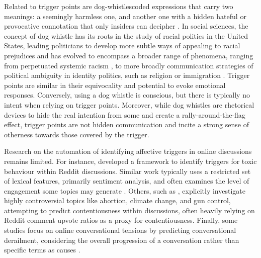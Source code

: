 Related to trigger points are dog-whistles\textemdash coded expressions that carry two meanings: a seemingly harmless one, and another one with a hidden hateful or provocative connotation that only insiders can decipher \cite{breitholtz-cooper-2021-dogwhistles2}. In social sciences, the concept of dog whistle has its roots in the study of racial politics in the United States, leading politicians to develop more subtle ways of appealing to racial prejudices \cite{lopez2013dog} and has evolved to encompass a broader range of phenomena, ranging from perpetuated systemic racism \cite{Filimon03032024}, to more broadly communication strategies of political ambiguity in identity politics\cite{Tolvanen24}, such as religion \cite{perry2023mating} or immigration \cite{filimon2016dog}. Trigger points are similar in their equivocality and potential to evoke emotional responses. Conversely, using a dog whistle is conscious, but there is typically no intent when relying on trigger points. Moreover, while dog whistles are rhetorical devices to hide the real intention from some and create a rally-around-the-flag effect, trigger points are not hidden communication and incite a strong sense of otherness towards those covered by the trigger. 

Research on the automation of identifying affective triggers in online discussions remains limited. For instance, \citet{almerekhi2022provoke} developed a framework to identify triggers for toxic behaviour within Reddit discussions. Similar work typically uses a restricted set of lexical features, primarily sentiment analysis, and often examines the level of engagement some topics may generate \cite{aldous2023really}. Others, such as \citet{beel2022linguistic}, explicitly investigate highly controversial topics like abortion, climate change, and gun control, attempting to predict contentiousness within discussions, often heavily relying on Reddit comment upvote ratios as a proxy for contentiousness.
Finally, some studies focus on online conversational tensions by predicting conversational derailment, considering the overall progression of a conversation rather than specific terms as causes \cite{zhang2018conversations,hessel2019something}. %




